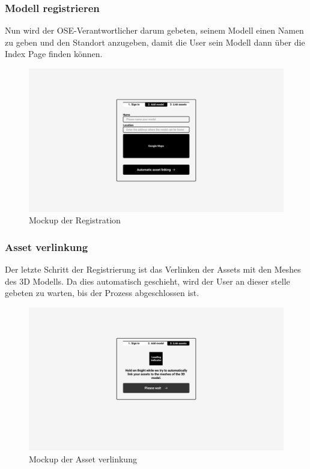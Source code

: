 \subsubsection{Modell registrieren}
Nun wird der OSE-Verantwortlicher darum gebeten, seinem Modell einen Namen zu geben und den Standort anzugeben, damit die User sein Modell dann über die Index Page finden können.
\begin{figure}[H]
  \centering
  \includegraphics[width=1\textwidth]{./mockups/register/stage_2.pdf}
  \caption[{Mockup der Registration}]{Mockup der Registration}
  \label{fig:mck-stage_2}
\end{figure}
\pagebreak
\subsubsection{Asset verlinkung}
Der letzte Schritt der Registrierung ist das Verlinken der Assets mit den Meshes des 3D Modells. Da dies automatisch geschieht, wird der User an dieser stelle gebeten zu warten, bis der Prozess abgeschlossen ist.
\begin{figure}[H]
  \centering
  \includegraphics[width=1\textwidth]{./mockups/register/stage_3.pdf}
  \caption[{Mockup der Asset verlinkung}]{Mockup der Asset verlinkung}
  \label{fig:mck-stage_3}
\end{figure}
\pagebreak
